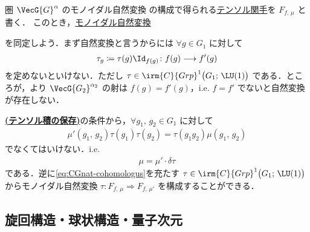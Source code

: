 \documentclass[TQFT_main]{subfiles}
\begin{document}
\begin{myexample}[label=def:CG-monoidalnat]{圏 $\VecG{G}^\alpha$ のモノイダル自然変換}
    の構成で得られる\hyperref[def:tensor-functor]{テンソル関手}を $F_{f,\, \mu}$ と書く．
    このとき，\hyperref[def:monoidal-nat]{モノイダル自然変換} 
    \begin{center}
    \end{center}
    を同定しよう．まず自然変換と言うからには $\forall g \in G_1$ に対して
    \begin{align}
        \tau_g \coloneqq \tau(g) \Id_{f(g)} \colon f(g) \lto f'(g)
    \end{align}
    を定めないといけない．ただし $\tau \in \irm{C}{Grp}^1\bigl(G_1;\, \LU(1)\bigr)$ である．ところが，より $\VecG{G_2}^{\alpha_2}$ の射は $f(g) = f'(g)$，i.e. $f = f'$ でないと自然変換が存在しない．

    \hyperref[def:monoidal-nat]{\textsf{\textbf{(テンソル積の保存)}}}の条件から，$\forall g_1,\, g_2 \in G_1$ に対して
    \begin{align}
        \mu'(g_1,\, g_2) \tau(g_1) \tau(g_2) = \tau(g_1g_2)\mu(g_1,\, g_2)
    \end{align}
    でなくてはいけない．i.e.
    \begin{align}
        \label{eq:CGnat-cohomologus}
        \mu = \mu' \cdot \delta \tau
    \end{align}
    である．逆に\eqref{eq:CGnat-cohomologus}を充たす $\tau \in \irm{C}{Grp}^1 \bigl( G_1;\, \LU(1) \bigr)$ からモノイダル自然変換 $\tau \colon F_{f,\, \mu} \Longrightarrow F_{f,\, \mu'}$ を構成することができる．
\end{myexample}


\subsection{旋回構造・球状構造・量子次元}
\end{document}
